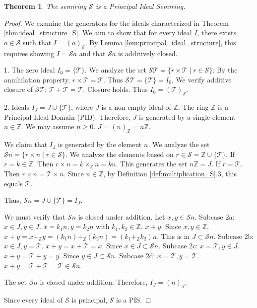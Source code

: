 \documentclass[11pt, a4paper]{article}
\theoremstyle{plain}
\newtheorem{theorem}{Theorem}[section]
\theoremstyle{definition}
\numberwithin{equation}{section}
\newcommand{\Z}{\mathbb{Z}}
\newcommand{\Tobj}{\mathcal{T}} %
\newcommand{\SemiringS}{\mathcal{S}}
\begin{document}
\begin{theorem}\label{thm:S_is_PIS}
The semiring $\SemiringS$ is a Principal Ideal Semiring.
\end{theorem}
\begin{proof}
We examine the generators for the ideals characterized in Theorem \ref{thm:ideal_structure_S}. We aim to show that for every ideal $I$, there exists $a \in \SemiringS$ such that $I=(a)_{\SemiringS}$. By Lemma \ref{lem:principal_ideal_structure}, this requires showing $I=\SemiringS a$ and that $\SemiringS a$ is additively closed.

1. The zero ideal $I_0=\{\Tobj\}$.
We analyze the set $\SemiringS\Tobj = \{r\times\Tobj \mid r \in \SemiringS\}$. By the annihilation property, $r\times\Tobj = \Tobj$. Thus $\SemiringS\Tobj = \{\Tobj\} = I_0$.
We verify additive closure of $\SemiringS\Tobj$: $\Tobj+\Tobj=\Tobj$. Closure holds. Thus $I_0=(\Tobj)_{\SemiringS}$.

2. Ideals $I_J = J \cup \{\Tobj\}$, where $J$ is a non-empty ideal of $\Z$.
The ring $\Z$ is a Principal Ideal Domain (PID). Therefore, $J$ is generated by a single element $n \in \Z$. We may assume $n \ge 0$. $J=(n)_{\Z}=n\Z$.

We claim that $I_J$ is generated by the element $n$. We analyze the set $\SemiringS n = \{r\times n \mid r \in \SemiringS\}$.
We analyze the elements based on $r \in \SemiringS = \Z \cup \{\Tobj\}$.
If $r=k \in \Z$. Then $r\times n = k\times_{\Z} n = kn$. This generates the set $n\Z = J$.
If $r=\Tobj$. Then $r\times n = \Tobj\times n$. Since $n \in \Z$, by Definition \ref{def:multiplication_S}.3, this equals $\Tobj$.

Thus, $\SemiringS n = J \cup \{\Tobj\} = I_J$.

We must verify that $\SemiringS n$ is closed under addition. Let $x, y \in \SemiringS n$.
Subcase 2a: $x \in J, y \in J$. $x=k_1 n, y=k_2 n$ with $k_1, k_2 \in \Z$.
$x+y$. Since $x, y \in \Z$, $x+y = x+_{\Z} y = (k_1 n) +_{\Z} (k_2 n) = (k_1+_{\Z} k_2)n$. This is in $J \subset \SemiringS n$.
Subcase 2b: $x \in J, y=\Tobj$. $x+y = x+\Tobj = x$. Since $x \in J \subset \SemiringS n$.
Subcase 2c: $x=\Tobj, y \in J$. $x+y = \Tobj+y = y$. Since $y \in J \subset \SemiringS n$.
Subcase 2d: $x=\Tobj, y=\Tobj$. $x+y = \Tobj+\Tobj = \Tobj \in \SemiringS n$.

The set $\SemiringS n$ is closed under addition. Therefore, $I_J = (n)_{\SemiringS}$.

Since every ideal of $\SemiringS$ is principal, $\SemiringS$ is a PIS.
\end{proof}
\end{document}

